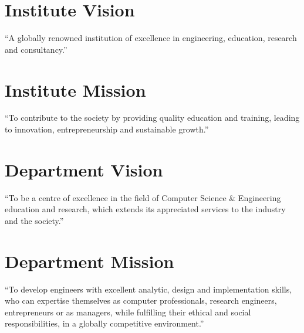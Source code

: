 \clearpage
\vspace*{\fill}
\begin{onehalfspace}
\begin{center} 
	\section*{Institute Vision}
	\begin{justify}
	``A globally renowned institution of excellence in engineering, education, research and consultancy.''
	\end{justify}
			
	\section*{Institute Mission}
	\begin{justify}
	``To contribute to the society by providing quality education and training, leading to innovation, entrepreneurship and sustainable growth.''
	\end{justify}
			
	\section*{Department Vision}
	\begin{justify}
	``To be a centre of excellence in the field of Computer Science \& Engineering education and research, which extends its appreciated services to the industry and the society.''
	\end{justify}
			
	\section*{Department Mission}
	\begin{justify}
	``To develop engineers with excellent analytic, design and implementation skills, who can expertise themselves as computer professionals, research engineers, entrepreneurs or as managers, while fulfilling their ethical and social responsibilities, in a globally competitive environment.''
	\end{justify}
\end{center}
\end{onehalfspace}
\vspace*{\fill}